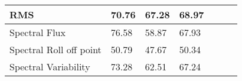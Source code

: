 \begin{table}[h!]
\begin{center}
\begin{tabular}{|l|l|l|l|l|l|l|}
                RMS
                &
                70.76
                &
                67.28
                &
                68.97
                \\\hline

                Spectral Flux
                &
                76.58
                &
                58.87
                &
                67.93
                \\\hline

                Spectral Roll off point
                &
                50.79
                &
                47.67
                &
                50.34
                \\\hline

                Spectral Variability
                &
                73.28
                &
                62.51
                &
                67.24
                \\\hline
                 \end{tabular}
        \end{center}
\end{table}

